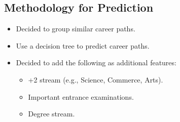 \documentclass[a4paper,12pt]{article}
\begin{document}
\subsection*{Methodology for Prediction}
\begin{itemize}
    \item Decided to group similar career paths.
    \item Use a decision tree to predict career paths.
    \item Decided to add the following as additional features:
    \begin{itemize}
        \item +2 stream (e.g., Science, Commerce, Arts).
        \item Important entrance examinations.
        \item Degree stream.
    \end{itemize}
\end{itemize}
\end{document}
